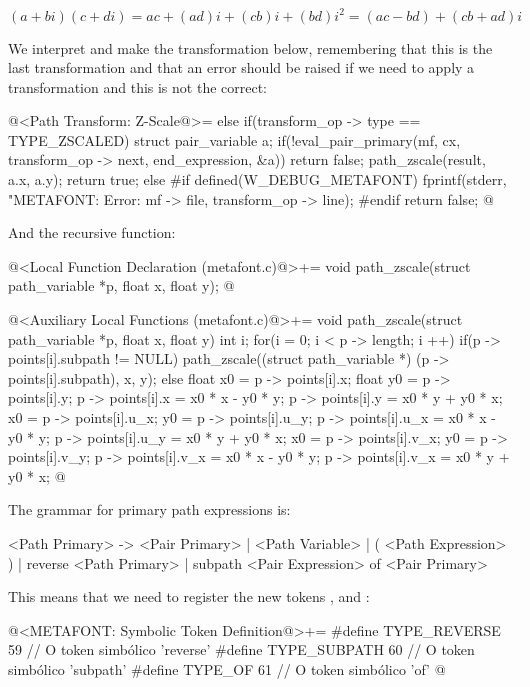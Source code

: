$$
(a+bi)(c+di) = ac + (ad)i + (cb)i + (bd)i^2 = (ac - bd) + (cb+ad)i
$$

We interpret and make the transformation below, remembering that this
is the last transformation and that an error should be raised if we
need to apply a transformation and this is not the correct:


\iniciocodigo
@<Path Transform: Z-Scale@>=
else if(transform_op -> type == TYPE_ZSCALED){
  struct pair_variable a;
  if(!eval_pair_primary(mf, cx, transform_op -> next, end_expression, &a))
    return false;
  path_zscale(result, a.x, a.y);  
  return true;
}
else{
#if defined(W_DEBUG_METAFONT)
  fprintf(stderr, "METAFONT: Error: %
          mf -> file, transform_op -> line);
#endif
  return false;
}
@
\fimcodigo

And the recursive function:

\iniciocodigo
@<Local Function Declaration (metafont.c)@>+=
void path_zscale(struct path_variable *p, float x, float y);
@
\fimcodigo

\iniciocodigo
@<Auxiliary Local Functions (metafont.c)@>+=
void path_zscale(struct path_variable *p, float x, float y){
  int i;
  for(i = 0; i < p -> length; i ++){
    if(p -> points[i].subpath != NULL)
      path_zscale((struct path_variable *) (p -> points[i].subpath),
                  x, y);
    else{
      float x0 = p -> points[i].x;
      float y0 = p -> points[i].y;
      p -> points[i].x = x0 * x - y0 * y;
      p -> points[i].y = x0 * y + y0 * x;
      x0 = p -> points[i].u_x;
      y0 = p -> points[i].u_y;
      p -> points[i].u_x = x0 * x - y0 * y;
      p -> points[i].u_y = x0 * y + y0 * x;
      x0 = p -> points[i].v_x;
      y0 = p -> points[i].v_y;
      p -> points[i].v_x = x0 * x - y0 * y;
      p -> points[i].v_x = x0 * y + y0 * x;
    }
  }
}
@
\fimcodigo


The grammar for primary path expressions is:

\alinhaverbatim
<Path Primary> -> <Pair Primary> | <Path Variable> |
                  ( <Path Expression> ) |
                  reverse <Path Primary> |
                  subpath <Pair Expression> of <Pair Primary>
\alinhanormal

This means that we need to register the new
tokens ,  and :


\iniciocodigo
@<METAFONT: Symbolic Token Definition@>+=
#define TYPE_REVERSE        59 // O token simbólico 'reverse'
#define TYPE_SUBPATH        60 // O token simbólico 'subpath'
#define TYPE_OF             61 // O token simbólico 'of'
@
\fimcodigo

